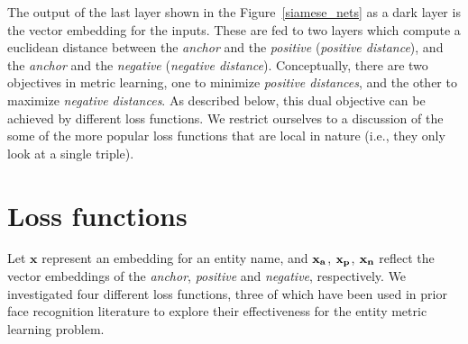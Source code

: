 



The output of the last layer shown in the Figure~\ref{siamese_nets} as a dark layer is the vector embedding for the inputs.  These are fed to two layers which compute a euclidean distance between the \textit{anchor} and the \textit{positive} (\textit{positive distance}), and the \textit{anchor} and the \textit{negative} (\textit{negative distance}).  Conceptually, there are two objectives in metric learning, one to minimize \textit{positive distances}, and the other to maximize \textit{negative distances}.  As described below, this dual objective can be achieved by different loss functions.  We restrict ourselves to a discussion of the some of the more popular loss functions that are local in nature (i.e., they only look at a single triple).  

\section{Loss functions}
\label{loss_functions}

Let $\mathbf{x}$ represent an embedding for an entity name, and $\bf{x_{a}}$, $\bf{x_{p}}$, $\bf{x_{n}}$ reflect the vector embeddings of the \textit{anchor}, \textit{positive} and \textit{negative}, respectively.  We investigated four different loss functions, three of which have been used in prior face recognition literature to explore their effectiveness for the entity metric learning problem.


